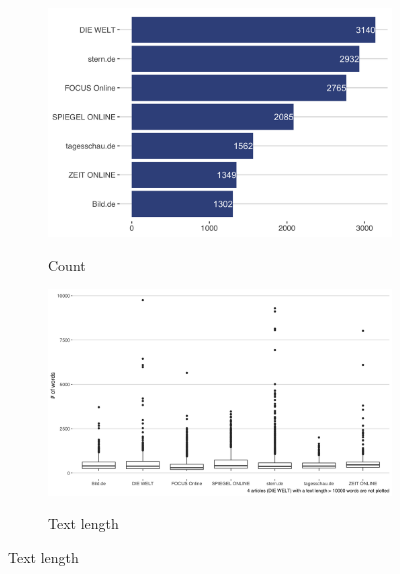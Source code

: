 \documentclass[12pt,a4paper,notitlepage]{article}
\begin{document}
\begin{figure}[H]
	\begin{center}
	\caption{News articles}
		\begin{subfigure}[normla]{0.39\textwidth}
			\caption{Count}
			\includegraphics[width=\textwidth]{../figs/article_sum.png}
			\label{fig_news_count}
		\end{subfigure}
		\begin{subfigure}[normla]{0.59\textwidth}
			\caption{Text length}
			\includegraphics[width=\textwidth]{../figs/news_releases_textlength}
			\label{fig_length}
		\end{subfigure}
	\end{center}
\end{figure}
\end{document}
